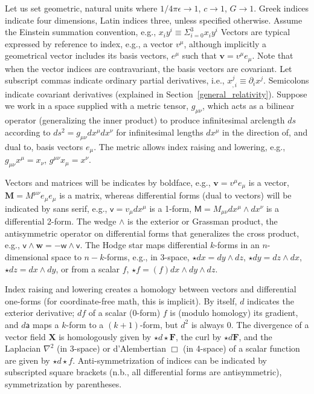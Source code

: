     Let us set geometric, natural units where $1/4\pi\epsilon \rightarrow 1$, $c \rightarrow 1$, $G \rightarrow 1$. 
Greek indices indicate four dimensions, Latin indices three, unless specified otherwise.
Assume the Einstein summation convention, e.g., $x_i y^i \equiv \Sigma_{i=0}^3 x_i y^i$
Vectors are typical expressed by reference to index, e.g., a vector $v^\mu$, although implicitly a geometrical vector includes its basis vectors, $e^\mu$ such that $\textbf{v} = v^\mu e_\mu$.
Note that when the vector indices are contravariant, the basis vectors are covariant.
Let subscript commas indicate ordinary partial derivatives, i.e., $x_{,i}^j \equiv \partial_i x^j$.
Semicolons indicate covariant derivatives (explained in Section~\ref{general_relativity}).
Suppose we work in a space supplied with a metric tensor, $g_{\mu\nu}$, which acts as a bilinear operator (generalizing the inner product) to produce infinitesimal arclength $ds$ according to $ds^2 = g_{\mu \nu} dx^\mu dx^\nu$ for infinitesimal lengths $dx^\mu$ in the direction of, and dual to, basis vectors $e_\mu$. 
The metric allows index raising and lowering, e.g., $g_{\mu \nu} x^\mu = x_\nu$, $g^{\mu \nu} x_\mu = x^\nu$.

Vectors and matrices will be indicates by boldface, e.g., $\textbf{v} = v^\mu e_\mu$ is a vector, $\textbf{M} = M^{\mu\nu} e_\mu e_\mu $ is a matrix, whereas differential forms (dual to vectors) will be indicated by sans serif, e.g., $\textsf{v} = v_\mu dx^\mu$ is a 1-form, $\textsf{M} = M_{\mu\nu} dx^\mu \wedge dx^\nu$ is a differential 2-form.
The wedge $\wedge$ is the exterior or Grassman product, the antisymmetric operator on differential forms that generalizes the cross product, e.g., $\textsf{v} \wedge \textbf{w} = -\textsf{w} \wedge \textsf{v}$.
The Hodge star maps differential $k$-forms in an $n$-dimensional space to $n-k$-forms, e.g., in 3-space, $\star dx = dy \wedge dz$, $\star dy = dz \wedge dx$, $\star dz = dx \wedge dy$, or from a scalar $f$, $\star f = (f) dx \wedge dy \wedge dz$. 

Index raising and lowering creates a homology between vectors and differential one-forms (for coordinate-free math, this is implicit).
By itself, $d$ indicates the exterior derivative; $df$ of a scalar (0-form) $f$ is (modulo homology) its gradient, and $d\textsf{a}$ maps a $k$-form to a $(k+1)$-form, but $d^2$ is always 0.
The divergence of a vector field $\textbf{X}$ is homologously given by $\star d \star \textbf{F}$, the curl by $\star d \textbf{F}$, and the Laplacian $\nabla^2$ (in 3-space) or d'Alembertian $\Box$ (in 4-space) of a scalar function are given by $\star d \star f$.
Anti-symmetrization of indices can be indicated by subscripted square brackets (n.b., all differential forms are antisymmetric), symmetrization by parentheses.


